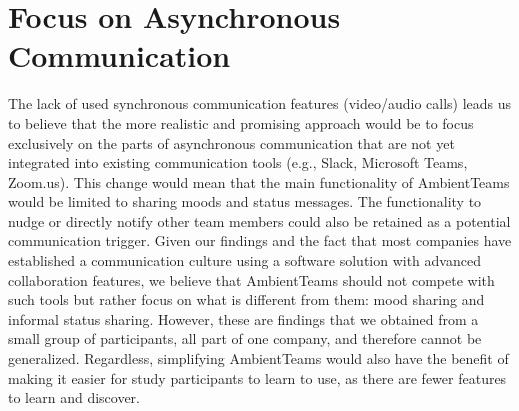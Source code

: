 \section{Focus on Asynchronous Communication}
The lack of used synchronous communication features (video/audio calls) leads us to believe that the more realistic and promising approach would be to focus exclusively on the parts of asynchronous communication that are not yet integrated into existing communication tools (e.g., Slack, Microsoft Teams, Zoom.us). This change would mean that the main functionality of AmbientTeams would be limited to sharing moods and status messages. The functionality to nudge or directly notify other team members could also be retained as a potential communication trigger. Given our findings and the fact that most companies have established a communication culture using a software solution with advanced collaboration features, we believe that AmbientTeams should not compete with such tools but rather focus on what is different from them: mood sharing and informal status sharing. However, these are findings that we obtained from a small group of participants, all part of one company, and therefore cannot be generalized. Regardless, simplifying AmbientTeams would also have the benefit of making it easier for study participants to learn to use, as there are fewer features to learn and discover.

